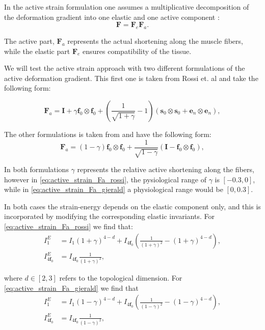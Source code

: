 \documentclass[a4paper,10pt]{article}
\newcommand{\ef}{\mathbf{f}_0}
\newcommand{\es}{\mathbf{s}_0}
\newcommand{\en}{\mathbf{e}_n}
\newcommand{\F}{\mathbf{F}}
\newcommand{\I}{\mathbf{I}}
\begin{document}
In the active strain formulation one assumes  a multiplicative 
decomposition of the deformation gradient into one elastic
and one active component \cite{ambrosi2011electromechanical}:
\begin{equation}
 \F = \F_e \F_a.
\label{eq:active_strain}
\end{equation}

The active part, $\F_a$ represents the actual shortening along the muscle fibers,
while the elastic part $\F_e$ ensures compatibility of the tissue. 

We will test the active strain approach with two different formulations of the
active deformation gradient. This first one is taken from Rossi et. al \cite{rossi2012orthotropic}
and take the following form:

\begin{equation}
 \F_a = \I +  \gamma \ef \otimes \ef  + \left( \frac{1}{\sqrt{1 + \gamma}} -1 \right) (\es \otimes \es + \en \otimes \en), 
 \label{eq:active_strain_Fa_rossi}
\end{equation}

The other formulations is taken from \cite{gjerald2014patient} and have the following form:
\begin{equation}
  \F_a = (1 - \gamma) \ef \otimes \ef  + \frac{1}{\sqrt{1 - \gamma}} (\I - \ef \otimes \ef), 
 \label{eq:active_strain_Fa_gjerald}
\end{equation}

In both formulations $\gamma$ represents the relative active shortening along the fibers, however in 
\eqref{eq:active_strain_Fa_rossi}, the pysiological range of $\gamma$ is $[-0.3,0]$, while in 
\eqref{eq:active_strain_Fa_gjerald} a physiological range would be $[0,0.3]$. 

In both cases the strain-energy depends on the elastic component only, and this is 
incorporated by modifying the corresponding elastic invariants. 
For \eqref{eq:active_strain_Fa_rossi} we find that:
\begin{align}
I_1^E &= I_1(1 + \gamma)^{4-d} +  I_{4\ef}\left(\frac{1}{(1+\gamma)^2} -(1+\gamma)^{4-d}\right) ,\\
I_{4\ef}^E &= I_{4\ef} \frac{1}{(1+\gamma)^2},
\end{align}

where $d \in [2,3]$ refers to the topological dimension. For \eqref{eq:active_strain_Fa_gjerald} we find that
\begin{align}
I_1^E &= I_1(1 - \gamma)^{4-d} +  I_{4\ef}\left(\frac{1}{(1-\gamma)^2} - (1-\gamma)^{4-d}\right) ,\\
I_{4\ef}^E &= I_{4\ef} \frac{1}{(1-\gamma)^2},
\end{align}
\end{document}
